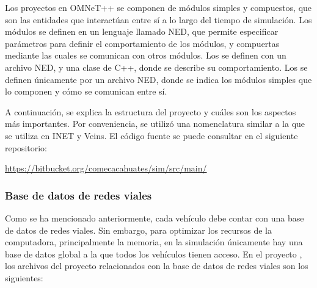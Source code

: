 Los proyectos en OMNeT++ se componen de módulos simples y compuestos, que son
las entidades que interactúan entre sí a lo largo del tiempo de simulación. Los
módulos se definen en un lenguaje llamado NED, que permite especificar
parámetros para definir el comportamiento de los módulos, y compuertas mediante
las cuales se comunican con otros módulos. Los  se
definen con un archivo NED, y una clase de C++, donde se describe su
comportamiento. Los  se definen únicamente por un
archivo NED, donde se indica los módulos simples que lo componen y cómo se
comunican entre sí.

A continuación, se explica la estructura del proyecto y cuáles son los aspectos
más importantes. Por conveniencia, se utilizó una nomenclatura similar a la que
se utiliza en INET y Veins. El código fuente se puede consultar en el siguiente
repositorio:

\begin{center}
\href{https://bitbucket.org/comecacahuates/sim/src/main/}{https://bitbucket.org/comecacahuates/sim/src/main/}
\end{center}


\subsubsection{Base de datos de redes viales}

\label{subsubsec:base_de_datos_de_redes_viales}

Como se ha mencionado anteriormente, cada vehículo debe contar con una base de
datos de redes viales. Sin embargo, para optimizar los recursos de la
computadora, principalmente la memoria, en la simulación únicamente hay una
base de datos global a la que todos los vehículos tienen acceso. En el proyecto
, los archivos del proyecto relacionados con la base de datos
de redes viales son los siguientes:
\newpage


